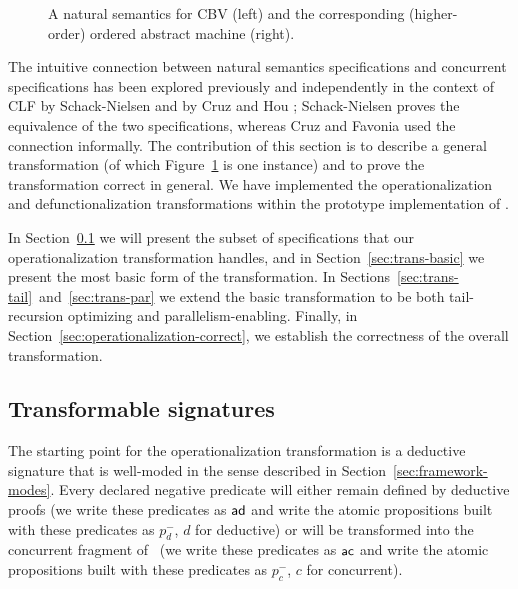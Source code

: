 \begin{figure}
\begin{minipage}[b]{0.36\linewidth}
\end{minipage}
\hspace{0.5cm}
\begin{minipage}[b]{0.64\linewidth}
\end{minipage}
\caption{A natural semantics for CBV (left) and the corresponding (higher-order)
  ordered abstract machine (right).}
\label{fig:example-transform-cbv}
\end{figure}

The intuitive connection between natural semantics specifications and
concurrent specifications has been explored previously and
independently in the context of CLF by Schack-Nielsen
\cite{schacknielsen07induction} and by Cruz and Hou
\cite{cruz12parallel}; Schack-Nielsen proves the equivalence of the
two specifications, whereas Cruz and Favonia used the connection
informally. The contribution of this section is to describe a general
transformation (of which Figure~\ref{fig:example-transform-cbv} is one
instance) and to prove the transformation correct in general. We have
implemented the operationalization
and defunctionalization transformations within the prototype
implementation of \sls.

In Section~\ref{sec:trans-subset} we will present the subset of
specifications that our operationalization transformation handles, and
in Section~\ref{sec:trans-basic} we present the most basic form of the
transformation.  In
Sections~\ref{sec:trans-tail}~and~\ref{sec:trans-par} we extend the
basic transformation to be both tail-recursion optimizing and
parallelism-enabling. Finally, in
Section~\ref{sec:operationalization-correct}, we establish the
correctness of the overall transformation.

\subsection{Transformable signatures}
\label{sec:trans-subset}

The starting point for the operationalization transformation is a
deductive signature that is well-moded in the sense described in
Section~\ref{sec:framework-modes}. Every declared negative predicate
will either remain defined by deductive proofs (we write these
predicates as ${\sf ad}$ and write the atomic propositions built with
these predicates as $p_d^-$, $d$ for deductive) or will be transformed
into the concurrent fragment of \sls~(we write these predicates as ${\sf
  ac}$ and write the atomic propositions built with these predicates
as $p_c^-$, $c$ for concurrent).

